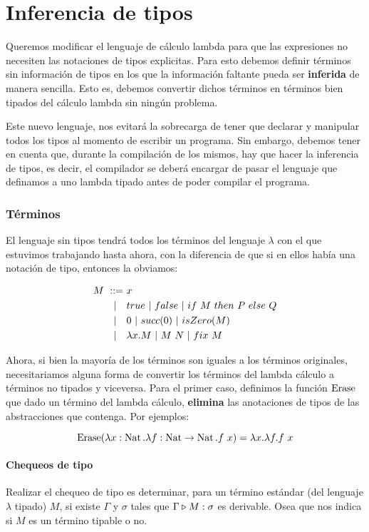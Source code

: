 \section{Inferencia de tipos}

Queremos modificar el lenguaje de cálculo lambda para que las expresiones no necesiten las notaciones de tipos explicitas. Para esto debemos definir términos sin información de tipos en los que la información faltante pueda ser \textbf{inferida} de manera sencilla. Esto es, debemos convertir dichos términos en términos bien tipados del cálculo lambda sin ningún problema.

Este nuevo lenguaje, nos evitará la sobrecarga de tener que declarar y manipular todos los tipos al momento de escribir un programa. Sin embargo, debemos tener en cuenta que, durante la compilación de los mismos, hay que hacer la inferencia de tipos, es decir, el compilador se deberá encargar de pasar el lenguaje que definamos a uno lambda tipado antes de poder compilar el programa.

\subsubsection*{Términos}
El lenguaje sin tipos tendrá todos los términos del lenguaje $\lambda$ con el que estuvimos trabajando hasta ahora, con la diferencia de que si en ellos había una notación de tipo, entonces la obviamos:

\begin{equation*}
\begin{split}
M~::=~&x \\
|~~~&true~|~false~|~if~ M~ then~ P~ else~ Q \\
|~~~&0~|~succ(0)~|~isZero(M) \\
|~~~& \lambda x. M~|~M~N~|~fix~M
\end{split}
\end{equation*}

Ahora, si bien la mayoría de los términos son iguales a los términos originales, necesitariamos alguna forma de convertir los términos del lambda cálculo a términos no tipados y viceversa. Para el primer caso, definimos la función $\operatorname{Erase}$ que dado un término del lambda cálculo, \textbf{elimina} las anotaciones de tipos de las abstracciones que contenga. Por ejemplos: 

$$\operatorname{Erase}(\lambda x: \operatorname{Nat} . \lambda f: \operatorname{Nat}\to\operatorname{Nat} . f~x) = \lambda x. \lambda f. f~x$$

\paragraph{Chequeos de tipo}
Realizar el chequeo de tipo es determinar, para un término estándar (del lenguaje $\lambda$ tipado) $M$, si existe $\Gamma$ y $\sigma$ tales que $\Gamma\triangleright M : \sigma$ es derivable. Osea que nos indica si $M$ es un término tipable o no.

